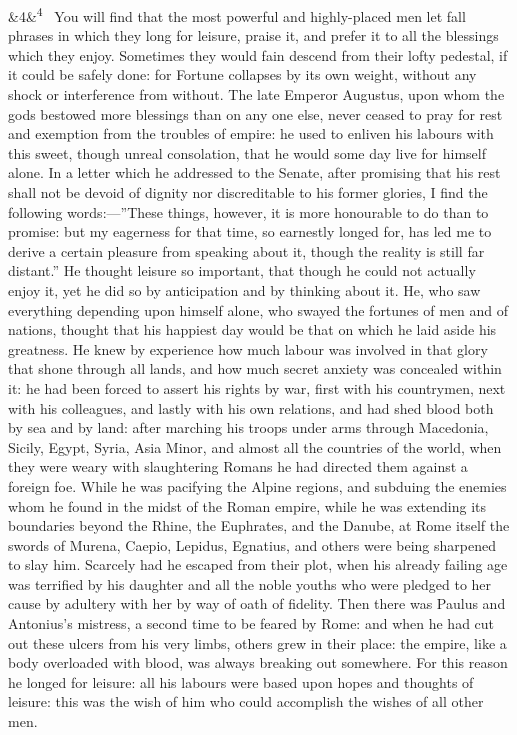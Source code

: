 \documentclass[12pt]{article}
\newcommand{\para}[1][]{\par\noindent\ifx&#1&\else\textsuperscript{\footnotesize #1}~\fi}
\begin{document}
\para[4] You will find that the most powerful and highly-placed men let fall phrases in which they long for leisure, praise it, and prefer it to all the blessings which they enjoy. Sometimes they would fain descend from their lofty pedestal, if it could be safely done: for Fortune collapses by its own weight, without any shock or interference from without. The late Emperor Augustus, upon whom the gods bestowed more blessings than on any one else, never ceased to pray for rest and exemption from the troubles of empire: he used to enliven his labours with this sweet, though unreal consolation, that he would some day live for himself alone. In a letter which he addressed to the Senate, after promising that his rest shall not be devoid of dignity nor discreditable to his former glories, I find the following words:—”These things, however, it is more honourable to do than to promise: but my eagerness for that time, so earnestly longed for, has led me to derive a certain pleasure from speaking about it, though the reality is still far distant.” He thought leisure so important, that though he could not actually enjoy it, yet he did so by anticipation and by thinking about it. He, who saw everything depending upon himself alone, who swayed the fortunes of men and of nations, thought that his happiest day would be that on which he laid aside his greatness. He knew by experience how much labour was involved in that glory that shone through all lands, and how much secret anxiety was concealed within it: he had been forced to assert his rights by war, first with his countrymen, next with his colleagues, and lastly with his own relations, and had shed blood both by sea and by land: after marching his troops under arms through Macedonia, Sicily, Egypt, Syria, Asia Minor, and almost all the countries of the world, when they were weary with slaughtering Romans he had directed them against a foreign foe. While he was pacifying the Alpine regions, and subduing the enemies whom he found in the midst of the Roman empire, while he was extending its boundaries beyond the Rhine, the Euphrates, and the Danube, at Rome itself the swords of Murena, Caepio, Lepidus, Egnatius, and others were being sharpened to slay him. Scarcely had he escaped from their plot, when his already failing age was terrified by his daughter and all the noble youths who were pledged to her cause by adultery with her by way of oath of fidelity. Then there was Paulus and Antonius’s mistress, a second time to be feared by Rome: and when he had cut out these ulcers from his very limbs, others grew in their place: the empire, like a body overloaded with blood, was always breaking out somewhere. For this reason he longed for leisure: all his labours were based upon hopes and thoughts of leisure: this was the wish of him who could accomplish the wishes of all other men.
\end{document}
